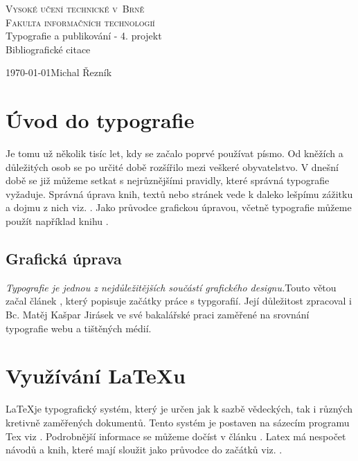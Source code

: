 \documentclass[11pt, a4paper]{article}
\begin{document}
\begin{titlepage}

\begin{center}
	\Huge
 	\textsc{Vysoké učení technické v~Brně\\
 		{\huge Fakulta informačních technologií}}\\
 		
	\LARGE
	 Typografie a publikování - 4. projekt\\ 
	 	\huge {Bibliografické citace}
\end{center}

{\Large \today \hfill Michal Řezník}
\end{titlepage}
\section*{Úvod do typografie}
    Je tomu už několik tisíc let, kdy se začalo poprvé používat písmo. Od kněžích a důležitých osob se po určité době rozšířilo mezi veškeré obyvatelstvo. V dnešní době se již můžeme setkat s nejrůznějšími pravidly, které správná typografie vyžaduje. Správná úprava knih, textů nebo stránek vede k daleko lešpímu zážitku a dojmu z nich viz. \cite{Noga2010}. Jako průvodce grafickou úpravou, včetně typografie můžeme použít například knihu \cite{Harris2009}.

\subsection*{Grafická úprava}
    \emph{Typografie je jednou z nejdůležitějších součástí grafického designu.}Touto větou začal článek \cite{Ovsyannykov2021}, který popisuje začátky práce s typgorafií. Její důležitost zpracoval i Bc. Matěj Kašpar Jirásek ve své bakalářské praci \cite{Jirasek2016} zaměřené na srovnání typografie webu a tištěných médií.

\section*{Využívání {\LaTeX}u}
    \LaTeX je typografický systém, který je určen jak k sazbě vědeckých, tak i různých kretivně zaměřených dokumentů. 
    Tento systém je postaven na sázecím programu Tex viz \cite{Olsak2021}.
    Podrobnější informace se můžeme dočíst v článku \cite{Davidek2019}. Latex má nespočet návodů a knih, které mají sloužit jako průvodce do začátků viz. \cite{Rybicka2003}.
    
\end{document}

